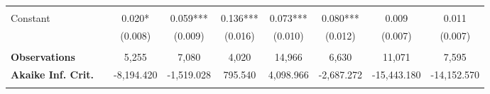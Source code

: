 \begin{tabular*}{\linewidth}{@{\extracolsep{\fill} } llccccccc}
\arrayrulecolor{white}%
\hline%
\arrayrulecolor{white}%
\hline%
\arrayrulecolor{white}%
\hline%
\arrayrulecolor{white}%
\hline%
\arrayrulecolor{white}%
\hline%
&&&&&&&&\\%
\multirow{2}{*}{Constant}&&0.020*&0.059***&0.136***&0.073***&0.080***&0.009&0.011\\%
&&(0.008)&(0.009)&(0.016)&(0.010)&(0.012)&(0.007)&(0.007)\\%
\arrayrulecolor{white}%
\hline%
\arrayrulecolor{white}%
\hline%
\arrayrulecolor{white}%
\hline%
\arrayrulecolor{white}%
\hline%
\arrayrulecolor{white}%
\hline%
&&&&&&&&\\%
\bfseries Observations&&5,255&7,080&4,020&14,966&6,630&11,071&7,595\\%
\bfseries Akaike Inf. Crit.&&{-}8,194.420&{-}1,519.028&795.540&4,098.966&{-}2,687.272&{-}15,443.180&{-}14,152.570\\%
\arrayrulecolor{white}%
\hline%
\arrayrulecolor{white}%
\hline%
\arrayrulecolor{white}%
\hline%
\arrayrulecolor{white}%
\hline%
\arrayrulecolor{white}%
\hline%
\arrayrulecolor{black}%
\hline%
\end{tabular*}